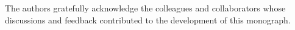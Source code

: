 
The authors gratefully acknowledge the colleagues and collaborators whose discussions and feedback contributed to the development of this monograph.